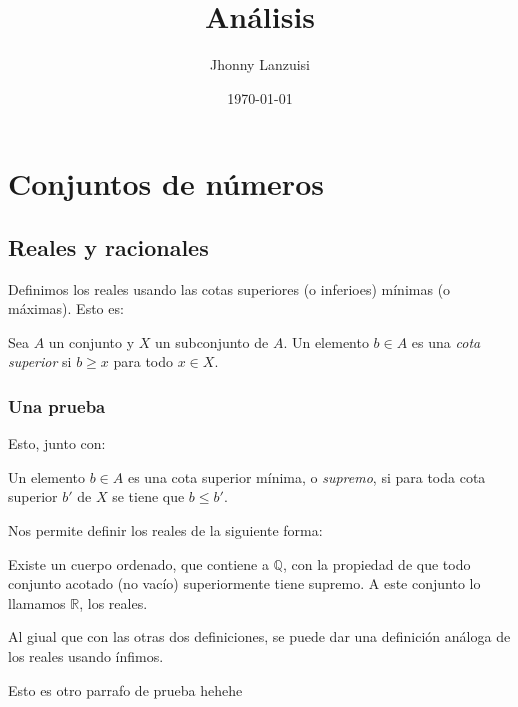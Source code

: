 \documentclass[11pt]{book}
\author{Jhonny Lanzuisi}
\date{\today}
\title{Análisis}
\begin{document}
\maketitle
\setcounter{tocdepth}{2}
\tableofcontents


\part{Conjuntos de números}
\label{sec:org0900251}

\chapter{Reales y racionales}
\label{sec:org6d10683}

Definimos los reales usando las cotas superiores (o inferioes) mínimas (o máximas).
Esto es:
\begin{definition}
Sea \(A\) un conjunto y \(X\) un subconjunto de \(A\).
Un elemento \(b\in A\) es una \emph{cota superior} si \(b\geq x\) para todo \(x\in X\).
\end{definition}
\section{Una prueba}
\label{sec:orgbca7332}
Esto, junto con:
\begin{definition}
Un elemento \(b\in A\) es una cota superior mínima, o \emph{supremo}, si
para toda cota superior \(b'\) de \(X\) se tiene que \(b\leq b'\).
\end{definition}
Nos permite definir los reales de la siguiente forma:
\begin{definition}
Existe un cuerpo ordenado, que contiene a \(\mathbb{Q}\),
con la propiedad de que todo conjunto acotado (no vacío) superiormente tiene supremo.
A este conjunto lo llamamos \(\mathbb{R}\), los reales.
\end{definition}
Al giual que con las otras dos definiciones, 
se puede dar una definición análoga de los reales usando ínfimos.

Esto es otro parrafo de prueba hehehe
\end{document}
